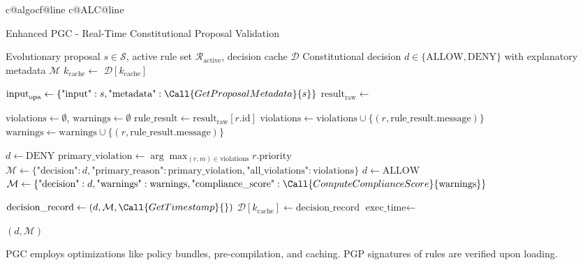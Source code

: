 \documentclass[sigconf,natbib]{acmart}
\makeatletter
\newcounter{algcounter}
\newcounter{alglinegs}
\newcounter{alglinepgc}
\newcounter{alglinevalidation}
\newcounter{alglinesafety}
\newcounter{alglineconflict}
\newcounter{alglinebias}
\newcommand{\resetalglineno}{%
  \stepcounter{algcounter}%
  \setcounter{ALG@line}{0}%
  \setcounter{alglinegs}{0}%
  \setcounter{alglinepgc}{0}%
  \setcounter{alglinevalidation}{0}%
  \setcounter{alglinesafety}{0}%
  \setcounter{alglineconflict}{0}%
  \setcounter{alglinebias}{0}%
  \ifcsname c@algocf@line\endcsname\setcounter{algocf@line}{0}\fi%
  \ifcsname c@ALC@line\endcsname\setcounter{ALC@line}{0}\fi%
}
\makeatother
\begin{document}
\begin{algorithm}[!htbp]
\resetalglineno
\caption{Enhanced PGC - Real-Time Constitutional Proposal Validation}
\label{alg:pgc_validation}
\begin{algorithmic}[1]
\Require Evolutionary proposal $s \in \mathcal{S}$, active rule set $\mathcal{R}_{\text{active}}$, decision cache $\mathcal{D}$
\Ensure Constitutional decision $d \in \{\text{ALLOW}, \text{DENY}\}$ with explanatory metadata $\mathcal{M}$
  \State $k_{\text{cache}} \gets$  
    \State {}
    \State \Return $\mathcal{D}[k_{\text{cache}}]$ 
  \EndIf

  \State $\text{input}_{\text{opa}} \gets \{\text{"input"}: s, \text{"metadata"}: \Call{GetProposalMetadata}{s}\}$
  \State $\text{result}_{\text{raw}} \gets$ 

  \State $\text{violations} \gets \emptyset$, $\text{warnings} \gets \emptyset$
    \State $\text{rule\_result} \gets \text{result}_{\text{raw}}[r.\text{id}]$
      \State $\text{violations} \gets \text{violations} \cup \{(r, \text{rule\_result}.\text{message})\}$
      \State $\text{warnings} \gets \text{warnings} \cup \{(r, \text{rule\_result}.\text{message})\}$
    \EndIf
  \EndFor

    \State $d \gets \text{DENY}$
    \State $\text{primary\_violation} \gets \arg\max_{(r,m) \in \text{violations}} r.\text{priority}$
    \State $\mathcal{M} \gets \{\text{"decision"}: d, \text{"primary\_reason"}: \text{primary\_violation}, \text{"all\_violations"}: \text{violations}\}$
  \Else
    \State $d \gets \text{ALLOW}$
    \State $\mathcal{M} \gets \{\text{"decision"}: d, \text{"warnings"}: \text{warnings}, \text{"compliance\_score"}: \Call{ComputeComplianceScore}{\text{warnings}}\}$
  \EndIf

  \State $\text{decision\_record} \gets (d, \mathcal{M}, \Call{GetTimestamp}{})$
  \State $\mathcal{D}[k_{\text{cache}}] \gets \text{decision\_record}$
  \State {}
  \State $\text{exec\_time} \gets$ 
  \State {}

  \State \Return $(d, \mathcal{M})$
\EndFunction
\end{algorithmic}
\end{algorithm}
PGC employs optimizations like policy bundles, pre-compilation, and caching. PGP signatures of rules are verified upon loading.
\end{document}
